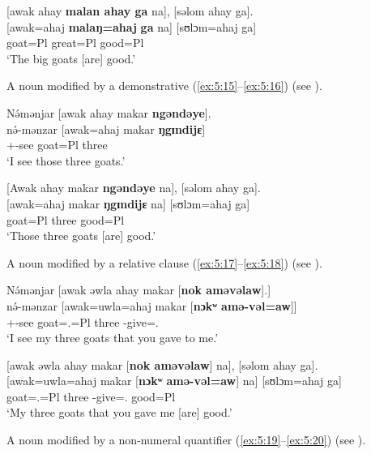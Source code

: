 \ea \label{ex:5:14}
{}[awak  ahay  \textbf{malan  ahay  ga}  na],  [səlom  ahay  ga].\\
\gll {}[awak=ahaj  \textbf{malaŋ}\textbf{=ahaj}  \textbf{ga}   na]   [sʊlɔm=ahaj   ga]\\
      goat=Pl  great=Pl  {\ADJ}  {\PSP}   good=Pl  {\ADJ}\\
\glt  ‘The big goats [are] good.’
\z

A noun modified by a demonstrative (\ref{ex:5:15}--\ref{ex:5:16}) (see ).

\ea \label{ex:5:15}
N\'{ə}mənjar  [awak  ahay  makar \textbf{ngəndəye}].\\
\gll  n\'{ə}-mənzar  [awak=ahaj  makar  \textbf{ŋgɪndijɛ}]\\
      {\oneS}+{\IFV}-see  goat=Pl  three  {\DEM}\\
\glt  ‘I see those three goats.’
\z

\ea \label{ex:5:16}
{}[Awak  ahay  makar \textbf{ngəndəye} na],  [səlom  ahay  ga].\\
\gll  {}[awak=ahaj   makar   \textbf{ŋgɪndijɛ}   na]   [sʊlɔm=ahaj   ga]\\
      goat=Pl  three  {\DEM}  {\PSP}  good=Pl  {\ADJ}\\
\glt  ‘Those three goats [are] good.’
\z

A noun modified by a relative clause (\ref{ex:5:17}--\ref{ex:5:18}) (see ).

\ea \label{ex:5:17}
N\'{ə}mənjar  [awak  əwla  ahay  makar  [\textbf{nok  aməvəlaw}].]\\
\gll  n\'{ə}-mənzar  [awak=uwla=ahaj  makar  [\textbf{nɔkʷ} \textbf{amə-vəl=aw}]]\\
      {\oneS}+{\IFV}-see  goat={\oneS}.{\POSS}=Pl  three  {\twoS}  {\DEP}-give={\oneS}.{\IO}\\
\glt  ‘I see my three goats that you gave to me.’
\z

\ea \label{ex:5:18}
{}[awak  əwla  ahay  makar  [\textbf{nok  aməvəlaw}]  na],  [səlom  ahay  ga].\\
\gll  {}[awak=uwla=ahaj   makar   [\textbf{nɔkʷ} \textbf{amə-vəl=aw}]  na]   [sʊlɔm=ahaj   ga]\\
      goat={\oneS}.{\POSS}=Pl  three  {\twoS}  {\DEP}-give={\oneS}.{\IO}  {\PSP}  good=Pl  {\ADJ}\\
\glt  ‘My three goats that you gave me [are] good.’
\z

A noun modified by a non-numeral quantifier (\ref{ex:5:19}--\ref{ex:5:20}) (see ).

